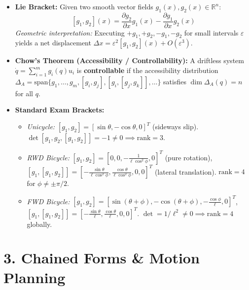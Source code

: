 \documentclass[10pt, a4paper]{article}
\begin{document}
\begin{itemize}
    \item \textbf{Lie Bracket:} Given two smooth vector fields $g_1(x), g_2(x) \in \mathbb{R}^n$:
    \[
        [g_1, g_2](x) = \frac{\partial g_2}{\partial x}g_1(x) - \frac{\partial g_1}{\partial x}g_2(x)
    \]
    \textit{Geometric interpretation:} Executing $+g_1, +g_2, -g_1, -g_2$ for small intervals $\varepsilon$ yields a net displacement $\Delta x = \varepsilon^2 [g_1, g_2](x) + O(\varepsilon^3)$.
    \item \textbf{Chow's Theorem (Accessibility / Controllability):} A driftless system $\dot{q} = \sum_{i=1}^m g_i(q)u_i$ is \textbf{controllable} if the accessibility distribution $\Delta_A = \text{span}\{g_1, \dots, g_m, [g_i, g_j], [g_i, [g_j, g_k]], \dots\}$ satisfies $\dim \Delta_A(q) = n$ for all $q$.
    \item \textbf{Standard Exam Brackets:}
    \begin{itemize}
        \item \textit{Unicycle:} $[g_1, g_2] = [\sin\theta, -\cos\theta, 0]^T$ (sideways slip). $\det[g_1, g_2, [g_1, g_2]] = -1 \neq 0 \implies \text{rank} = 3$.
        \item \textit{RWD Bicycle:} $[g_1, g_2] = [0, 0, -\frac{1}{\ell\cos^2\phi}, 0]^T$ (pure rotation), $[g_1, [g_1, g_2]] = [-\frac{\sin\theta}{\ell\cos^2\phi}, \frac{\cos\theta}{\ell\cos^2\phi}, 0, 0]^T$ (lateral translation). $\text{rank} = 4$ for $\phi \neq \pm \pi/2$.
        \item \textit{FWD Bicycle:} $[g_1, g_2] = [\sin(\theta+\phi), -\cos(\theta+\phi), -\frac{\cos\phi}{\ell}, 0]^T$, $[g_1, [g_1, g_2]] = [-\frac{\sin\theta}{\ell}, \frac{\cos\theta}{\ell}, 0, 0]^T$. $\det = 1/\ell^2 \neq 0 \implies \text{rank} = 4$ globally.
    \end{itemize}
\end{itemize}

\section*{3. Chained Forms \& Motion Planning}
\end{document}
